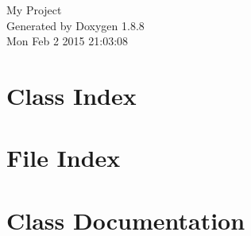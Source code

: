 \documentclass[twoside]{book}
\newcommand{\+}{\discretionary{\mbox{\scriptsize$\hookleftarrow$}}{}{}}
\newcommand{\clearemptydoublepage}{%
  \newpage{\pagestyle{empty}\cleardoublepage}%
}
\begin{document}
\hypersetup{pageanchor=false,
             bookmarks=true,
             bookmarksnumbered=true,
             pdfencoding=unicode
            }
\begin{titlepage}
\vspace*{7cm}
\begin{center}%
{\Large My Project }\\
\vspace*{1cm}
{\large Generated by Doxygen 1.8.8}\\
\vspace*{0.5cm}
{\small Mon Feb 2 2015 21:03:08}\\
\end{center}
\end{titlepage}
\clearemptydoublepage
\tableofcontents
\clearemptydoublepage
{}
\hypersetup{pageanchor=true}

\chapter{Class Index}

\chapter{File Index}

\chapter{Class Documentation}








































\end{document}
